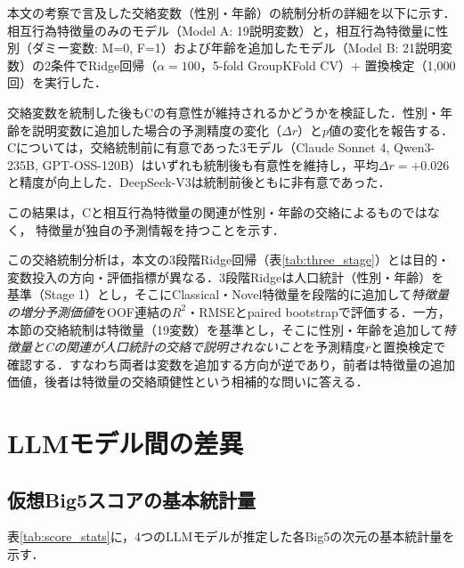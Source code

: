 \documentclass[dvipdfmx,11pt,a4paper]{bxjsarticle}
\renewcommand{\_}{\paperorigunderscore\allowbreak}%
\begin{document}
本文の考察で言及した交絡変数（性別・年齢）の統制分析の詳細を以下に示す．相互行為特徴量のみのモデル（Model A: 19説明変数）と，相互行為特徴量に性別（ダミー変数: M=0, F=1）および年齢を追加したモデル（Model B: 21説明変数）の2条件でRidge回帰（$\alpha = 100$，5-fold GroupKFold CV）+ 置換検定（1,000回）を実行した．

交絡変数を統制した後もCの有意性が維持されるかどうかを検証した．性別・年齢を説明変数に追加した場合の予測精度の変化（$\Delta r$）と$p$値の変化を報告する．Cについては，交絡統制前に有意であった3モデル（Claude Sonnet 4, Qwen3-235B, GPT-OSS-120B）はいずれも統制後も有意性を維持し，平均$\Delta r = +0.026$と精度が向上した．DeepSeek-V3は統制前後ともに非有意であった．

この結果は，Cと相互行為特徴量の関連が性別・年齢の交絡によるものではなく，
特徴量が独自の予測情報を持つことを示す．

この交絡統制分析は，本文の3段階Ridge回帰（表\ref{tab:three_stage}）とは目的・変数投入の方向・評価指標が異なる．3段階Ridgeは人口統計（性別・年齢）を基準（Stage 1）とし，そこにClassical・Novel特徴量を段階的に追加して\emph{特徴量の増分予測価値}をOOF連結の$R^2$・RMSEとpaired bootstrapで評価する．一方，本節の交絡統制は特徴量（19変数）を基準とし，そこに性別・年齢を追加して\emph{特徴量とCの関連が人口統計の交絡で説明されないこと}を予測精度$r$と置換検定で確認する．すなわち両者は変数を追加する方向が逆であり，前者は特徴量の追加価値，後者は特徴量の交絡頑健性という相補的な問いに答える．


\section{LLMモデル間の差異}
\label{sec:appendix_llm}

\subsection{仮想Big5スコアの基本統計量}
\label{sec:appendix_score_stats}

表\ref{tab:score_stats}に，4つのLLMモデルが推定した各Big5の次元の基本統計量を示す．

\end{document}
